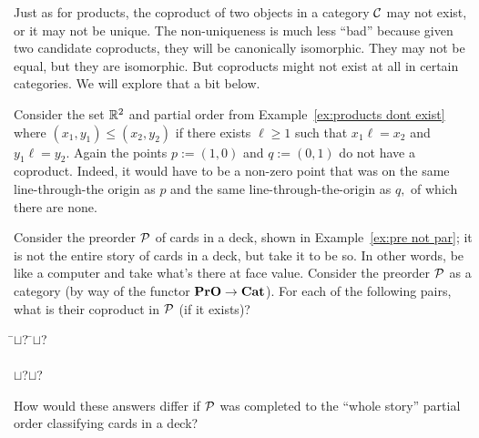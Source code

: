 \documentclass[../main/CT4S-EN-RU]{subfiles}
\begin{document}
\begin{exampleRUS}
\end{exampleRUS}

\begin{blockENG}
Just as for products, the coproduct of two objects in a category $\mathcal{C}$ may not exist, or it may not be unique. The non-uniqueness is much less “bad” because given two candidate coproducts, they will be canonically isomorphic. They may not be equal, but they are isomorphic. But coproducts might not exist at all in certain categories. We will explore that a bit below.
\end{blockENG}

\begin{blockRUS}
\end{blockRUS}

\begin{exampleENG}
Consider the set ${\mathbb R}^2$ and partial order from Example~\ref{ex:products dont exist} where $(x_1,y_1)\leq (x_2,y_2)$ if there exists $\ell\geq 1$ such that $x_1\ell=x_2$ and $y_1\ell=y_2.$ Again the points $p:=(1,0)$ and $q:=(0,1)$ do not have a coproduct. Indeed, it would have to be a non-zero point that was on the same line-through-the origin as $p$ and the same line-through-the-origin as $q,$ of which there are none.
\end{exampleENG}

\begin{exampleRUS}
\end{exampleRUS}

\begin{exerciseENG}
Consider the preorder $\mathcal{P}$ of cards in a deck, shown in Example~\ref{ex:pre not par}; it is not the entire story of cards in a deck, but take it to be so. In other words, be like a computer and take what's there at face value. Consider the preorder $\mathcal{P}$ as a category (by way of the functor ${\mathbf{PrO}}\rightarrow{\mathbf{Cat}}$). For each of the following pairs, what is their coproduct in $\mathcal{P}$ (if it exists)?
\sexc 
\begin{tabbing}
\hspace{.5in}\= $\sqcup$\;?\hspace{.5in} \=$\sqcup$\;?\\\\
\> $\sqcup$\;?\>$\sqcup$\;?
\end{tabbing}
\item How would these answers differ if $\mathcal{P}$ was completed to the “whole story” partial order classifying cards in a deck?
\endsexc
\end{exerciseENG}
\end{document}
